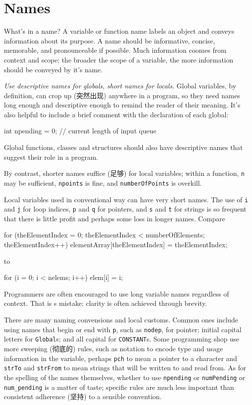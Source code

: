 \section{Names}
\label{sec:names}
What's in a name? A variable or function name labels an object and conveys
information about its purpose. A name should be informative, concise,
memorable, and pronounceable if possible. Much information coomes from
context and scope; the broader the scope of a variable, the more
information should be conveyed by it's name.

\emph{Use descriptive names for globals, short names for locals.} Global
variables, by definition, can crop up (突然出现) anywhere in a program, so
they need names long enough and descriptive enough to remind the reader of
their meaning. It's also helpful to include a brief comment with the
declaration of each global:
\begin{wellcode}
    int npending = 0;   // current length of input queue
\end{wellcode}
Global functions, classes and structures should also have descriptive names
that suggest their role in a program.

By contrast, shorter names suffice (足够) for local variables; within a
function, \verb"n" may be sufficient, \verb"npoints" is fine, and
\verb"numberOfPoints" is overkill.

Local variables used in conventional way can have very short names. The use
of \verb"i" and \verb"j" for loop indices, \verb"p" and \verb"q" for
pointers, and \verb"s" and \verb"t" for strings is so frequent that there
is little profit and perhaps some loss in longer names. Compare
\begin{badcode}
    for (theElementIndex = 0; theElementIndex < numberOfElements;
            theElementIndex++)
        elementArray[theElementIndex] = theElementIndex;
\end{badcode}
to 
\begin{wellcode}
    for (i = 0; i < nelems; i++)
        elem[i] = i;
\end{wellcode}
Programmers are often encouraged to use long variable names regardless of
context. That is s mistake: clarity is often achieved through brevity.

There are many naming convensions and local customs. Common ones include
using names that begin or end with \verb"p", such as \verb"nodep", for
pointer; initial capital letters for \verb"Global"s; and all capital for
\verb"CONSTANT"s. Some programming shop use more sweeping (彻底的) rules,
such as notation to encode type and usage information in the variable,
perhaps \verb"pch" to mean a pointer to a character and \verb"strTo" and
\verb"strFrom" to mean strings that will be written to and read from. As
for the spelling of the names themselves, whether to use \verb"npending" or
\verb"numPending" or \verb"num_pending" is a matter of taste; specific
rules are much less important than consistent adherence (坚持) to a sensible
convention.

